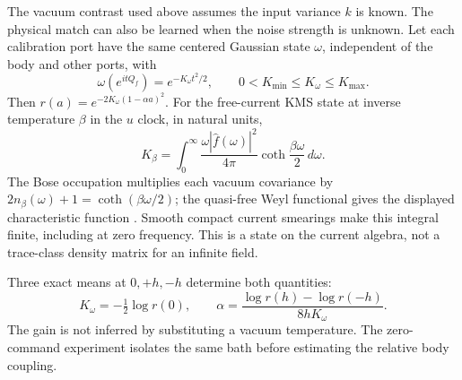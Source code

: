 \documentclass[11pt]{article}
\theoremstyle{definition}
\theoremstyle{remark}
\begin{document}
The vacuum contrast used above assumes the input variance $k$ is known.
The physical match can also be learned when the noise strength is unknown.
Let each calibration port have the same centered Gaussian state $\omega$,
independent of the body and other ports, with
\[
 \omega(e^{itQ_f})=e^{-K_\omega t^2/2},\qquad
 0<K_{\min}\le K_\omega\le K_{\max}.
\]
Then $r(a)=e^{-2K_\omega(1-\alpha a)^2}$. For the free-current KMS state
at inverse temperature $\beta$ in the $u$ clock, in natural units,
\begin{equation}
 K_\beta=\int_0^\infty\frac{\omega|\hat f(\omega)|^2}{4\pi}
                 \coth\frac{\beta\omega}{2}\,d\omega.
 \label{eq:thermal_variance}
\end{equation}
The Bose occupation multiplies each vacuum covariance by
$2n_\beta(\omega)+1=\coth(\beta\omega/2)$; the quasi-free Weyl
functional gives the displayed characteristic function
\cite{DerezinskiGerard2023}. Smooth compact current smearings make this
integral finite, including at zero frequency. This is a state on the
current algebra, not a trace-class density matrix for an infinite field.

Three exact means at $0,+h,-h$ determine both quantities:
\begin{equation}
 K_\omega=-\tfrac12\log r(0),\qquad
 \alpha=\frac{\log r(h)-\log r(-h)}{8hK_\omega}.
 \label{eq:unknown_variance_calibration}
\end{equation}
The gain is not inferred by substituting a vacuum temperature. The
zero-command experiment isolates the same bath before estimating the
relative body coupling.
\end{document}
